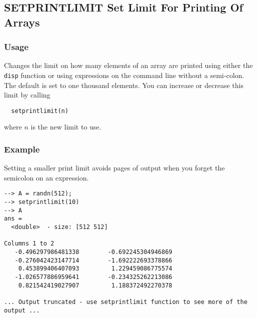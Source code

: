 %
%
%
\subsection{SETPRINTLIMIT Set Limit For Printing Of Arrays}
\subsubsection{Usage}
Changes the limit on how many elements of an array are printed
using either the \verb|disp| function or using expressions on the
command line without a semi-colon.  The default is set to 
one thousand elements.  You can increase or decrease this
limit by calling
\begin{verbatim}
  setprintlimit(n)
\end{verbatim}
where $n$ is the new limit to use.
\subsubsection{Example}
Setting a smaller print limit avoids pages of output when you forget the semicolon on an expression.
\begin{verbatim}
--> A = randn(512);
--> setprintlimit(10)
--> A
ans =
  <double>  - size: [512 512]
  
Columns 1 to 2
   -0.496297986481338        -0.692245304946869
   -0.276042423147714        -1.692222693378866
    0.453899406407093         1.229459086775574
   -1.026577886959641        -0.234325262213086
    0.821542419027907         1.188372492270378
 
... Output truncated - use setprintlimit function to see more of the output ...
\end{verbatim}
